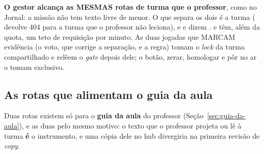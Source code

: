 \begin{regra}
\textbf{O gestor alcança as MESMAS rotas de turma que o professor}, como no
Jornal: a missão não tem texto livre de menor. O que separa os dois é a turma
( devolve 404 para a turma que o professor não leciona), e
 e  dizem . 
e  têm, além da quota, um teto de requisição por minuto.
As duas jogadas que MARCAM evidência (o voto, que corrige a separação, e a regra) tomam o
\emph{lock} da turma compartilhado e relêem o \emph{gate} depois dele; o botão,
zerar, homologar e pôr no ar o tomam exclusivo.
\end{regra}

\subsection{As rotas que alimentam o guia da aula}

Duas rotas existem só para o \textbf{guia da aula} do professor
(Seção~\ref{sec:guia-da-aula}), e as duas pelo mesmo motivo: o texto que o
professor projeta ou lê à turma \textbf{é} o instrumento, e uma cópia dele no
hub divergiria na primeira revisão de \emph{copy}.

